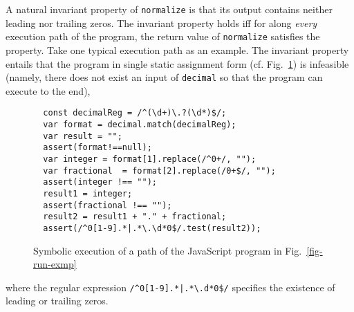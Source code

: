 A natural invariant property of {\tt normalize} is that its output contains neither leading nor trailing zeros. The invariant property holds iff for along \emph{every} execution path of the program, the return value of {\tt normalize} satisfies the property. 
%
Take one typical execution path as an example. %
The invariant property entails that the  program in single static assignment form (cf. Fig.~\ref{fig-run-exmp-path}) is infeasible (namely, there does not exist an input of {\tt decimal} so that the program can execute to the end), 
\begin{figure}[htbp]
\begin{center}
\begin{verbatim}
  const decimalReg = /^(\d+)\.?(\d*)$/;
  var format = decimal.match(decimalReg);
  var result = "";
  assert(format!==null);
  var integer = format[1].replace(/^0+/, "");
  var fractional  = format[2].replace(/0+$/, "");
  assert(integer !== ""); 
  result1 = integer;
  assert(fractional !== ""); 
  result2 = result1 + "." + fractional;
  assert(/^0[1-9].*|.*\.\d*0$/.test(result2));
\end{verbatim}
\end{center}
\label{fig-run-exmp-path}
\caption{Symbolic execution of a path of the JavaScript program in Fig.~\ref{fig-run-exmp}}
\end{figure}
where the regular expression {\tt /\^{}0[1-9].*|.*{\footnotesize\textbackslash}.d*0\$/} specifies the existence of leading or trailing zeros.

